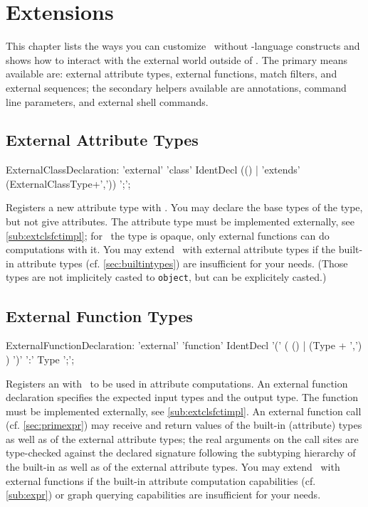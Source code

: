 \chapter{Extensions}\label{chapextensions}

This chapter lists the ways you can customize \GrG~without \GrG-language constructs and
shows how to interact with the external world outside of \GrG.
The primary means available are: external attribute types, external functions, match filters, and external sequences; the secondary helpers available are annotations, command line parameters, and external shell commands.

\section{External Attribute Types}\label{sub:extcls}
\begin{rail}
  ExternalClassDeclaration: 'external' 'class' IdentDecl (() | 'extends' (ExternalClassType+',')) ';';
\end{rail}
Registers a new attribute type with \GrG. You may declare the base types of the type, but not give attributes. The attribute type must be implemented externally, see \ref{sub:extclsfctimpl}; for \GrG~the type is opaque, only external functions can do computations with it. You may extend \GrG~with external attribute types if the built-in attribute types (cf. \ref{sec:builtintypes}) are insufficient for your needs.
(Those types are not implicitely casted to \texttt{object}, but can be explicitely casted.)

\section{External Function Types}\label{sub:extfct}
\begin{rail}
  ExternalFunctionDeclaration: 'external' 'function' IdentDecl '(' ( () | (Type + ',') ) ')' ':' Type ';';
\end{rail}
Registers an  with \GrG~to be used in attribute computations.
An external function declaration specifies the expected input types and the output type. The function must be implemented externally, see \ref{sub:extclsfctimpl}.
An external function call (cf. \ref{sec:primexpr}) may receive and return values of the built-in (attribute) types as well as of the external attribute types; the real arguments on the call sites are type-checked against the declared signature following the subtyping hierarchy of the built-in as well as of the external attribute types.
You may extend \GrG~with external functions if the built-in attribute computation capabilities (cf. \ref{sub:expr}) or graph querying capabilities are insufficient for your needs.


